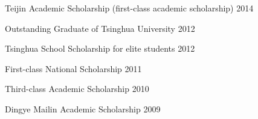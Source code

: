 

\begin{cvhonors}
  \cvhonor
  {Teijin Academic Scholarship (first-class academic scholarship)}
  {2014}
  
  \cvhonor
  {Outstanding Graduate of Tsinghua University}
  {2012}
  
  \cvhonor
  {Tsinghua School Scholarship for elite students}
  {2012}
  
  \cvhonor
  {First-class National Scholarship}
  {2011}
  
  \cvhonor
  {Third-class Academic Scholarship}
  {2010}
  
  \cvhonor
  {Dingye Mailin Academic Scholarship}
  {2009}
\end{cvhonors}